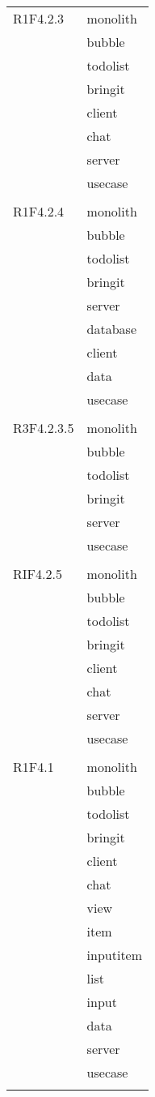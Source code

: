 \begin{center}
\begin{longtable}{|p{7cm}|p{7cm}|}
		R1F4.2.3 & monolith \\ & bubble \\ & todolist \\ & bringit \\ & client \\ & chat \\ & server \\ & usecase \\ & \\ \hline
		R1F4.2.4 & monolith \\ & bubble \\ & todolist \\ & bringit \\ & server \\ & database \\ & client \\ & data \\ & usecase \\ & \\ \hline
		R3F4.2.3.5 & monolith \\ & bubble \\ & todolist \\ & bringit \\ & server \\ & usecase \\ & \\ \hline
		RIF4.2.5 & monolith \\ & bubble \\ & todolist \\ & bringit \\ & client \\ & chat \\ & server \\ & usecase \\ & \\ \hline
		R1F4.1 & monolith \\ & bubble \\ & todolist \\ & bringit \\ & client \\ & chat \\ & view \\ & item \\ & inputitem \\ & list \\ & input \\ & data \\ & server \\ & usecase \\ & \\ \hline

\end{longtable}
\end{center}
